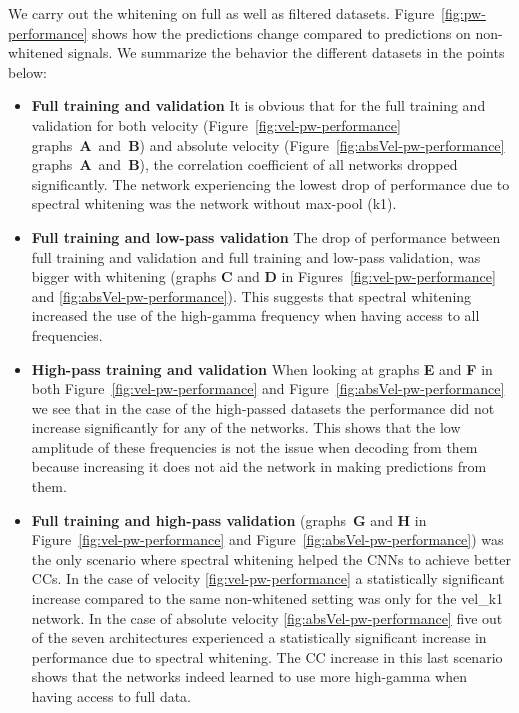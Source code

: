 We carry out the whitening on full as well as filtered datasets. 
Figure~\ref{fig:pw-performance} shows how the predictions change compared to predictions on non-whitened signals.
We summarize the behavior the different datasets in the points below:
\begin{itemize}
    \item \textbf{Full training and validation} It is obvious that for the full training and validation for both velocity (Figure~\ref{fig:vel-pw-performance} graphs~\textbf{A}~and~\textbf{B}) and absolute velocity (Figure~\ref{fig:absVel-pw-performance} graphs~\textbf{A}~and~\textbf{B}), the correlation coefficient of all networks dropped significantly. The network experiencing the lowest drop of performance due to spectral whitening was the network without max-pool (k1).

    \item \textbf{Full training and low-pass validation} The drop of performance between full training and validation and full training and low-pass validation, was bigger with whitening (graphs \textbf{C} and \textbf{D} in Figures~\ref{fig:vel-pw-performance} and \ref{fig:absVel-pw-performance}). This suggests that spectral whitening increased the use of the high-gamma frequency when having access to all frequencies.  
    
    \item \textbf{High-pass training and validation} When looking at graphs \textbf{E} and \textbf{F} in both Figure~\ref{fig:vel-pw-performance} and Figure~\ref{fig:absVel-pw-performance} we see that in the case of the high-passed datasets the performance did not increase significantly for any of the networks. 
    This shows that the low amplitude of these frequencies is not the issue when decoding from them because increasing it does not aid the network in making predictions from them.
    
    \item \textbf{Full training and high-pass validation} (graphs~\textbf{G} and \textbf{H} in Figure~\ref{fig:vel-pw-performance} and Figure~\ref{fig:absVel-pw-performance})
    was the only scenario where spectral whitening helped the CNNs to achieve better CCs. 
    In the case of velocity \ref{fig:vel-pw-performance} a statistically significant increase compared to the same non-whitened setting was only for the vel\_k1 network.
    In the case of absolute velocity \ref{fig:absVel-pw-performance} five out of the seven architectures experienced a statistically significant increase in performance due to spectral whitening.
    The CC increase in this last scenario shows that the networks indeed learned to use more high-gamma when having access to full data.
\end{itemize}


